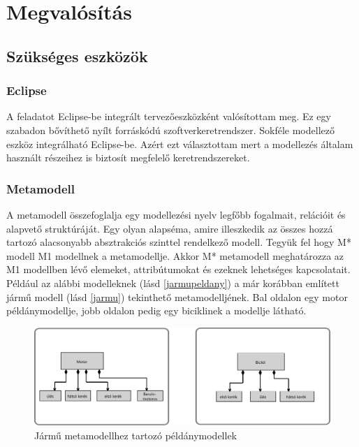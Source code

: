 \chapter{Megvalósítás}
\section{Szükséges eszközök}
\subsection{Eclipse}
A feladatot Eclipse-be integrált tervezőeszközként valósítottam meg. Ez egy szabadon bővíthető nyílt forráskódú szoftverkeretrendszer. Sokféle modellező eszköz integrálható  Eclipse-be. Azért ezt választottam mert a modellezés általam használt részeihez is biztosít megfelelő keretrendszereket.
\subsection{Metamodell}
A metamodell összefoglalja egy modellezési nyelv legfőbb fogalmait, relációit és alapvető struktúráját. Egy olyan alapséma, amire illeszkedik az összes hozzá tartozó alacsonyabb absztrakciós szinttel rendelkező modell. 
Tegyük fel hogy M* modell M1 modellnek a metamodellje.
Akkor M* metamodell meghatározza az M1 modellben lévő elemeket, attribútumokat és ezeknek lehetséges kapcsolatait. Például az alábbi modelleknek (lásd \autoref{jarmupeldany}) a már korábban említett jármű modell (lásd \autoref{jarmu}) tekinthető metamodelljének. Bal oldalon egy motor példánymodellje, jobb oldalon pedig egy biciklinek a modellje látható.

\begin{figure}[!ht]
	\centering
	\includegraphics[width=130mm]{figures/peldany.pdf}
	\caption{Jármű metamodellhez tartozó példánymodellek} 
	\label{jarmupeldany}
\end{figure}

